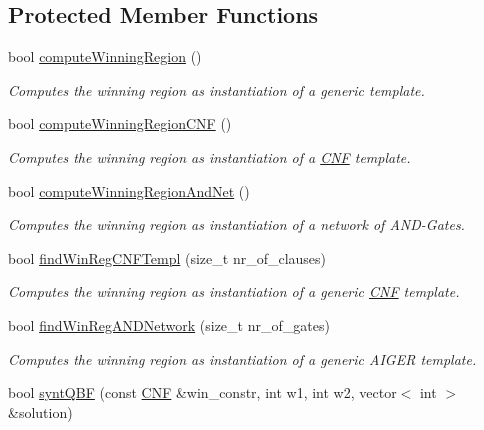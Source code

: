 \subsection*{Protected Member Functions}
\begin{DoxyCompactItemize}
\item 
bool \hyperlink{classTemplateSynth_ae334e4a6c30a324cfd4d0c05a32b191c}{compute\-Winning\-Region} ()
\begin{DoxyCompactList}\small\item\em Computes the winning region as instantiation of a generic template. \end{DoxyCompactList}\item 
bool \hyperlink{classTemplateSynth_affe9f11a75e689fd631692feac4031a1}{compute\-Winning\-Region\-C\-N\-F} ()
\begin{DoxyCompactList}\small\item\em Computes the winning region as instantiation of a \hyperlink{classCNF}{C\-N\-F} template. \end{DoxyCompactList}\item 
bool \hyperlink{classTemplateSynth_a9197dff7678cd88a7fea3c6b4358f85d}{compute\-Winning\-Region\-And\-Net} ()
\begin{DoxyCompactList}\small\item\em Computes the winning region as instantiation of a network of A\-N\-D-\/\-Gates. \end{DoxyCompactList}\item 
bool \hyperlink{classTemplateSynth_a499d1c0069b41ce11a6c7e7679fd4ece}{find\-Win\-Reg\-C\-N\-F\-Templ} (size\-\_\-t nr\-\_\-of\-\_\-clauses)
\begin{DoxyCompactList}\small\item\em Computes the winning region as instantiation of a generic \hyperlink{classCNF}{C\-N\-F} template. \end{DoxyCompactList}\item 
bool \hyperlink{classTemplateSynth_a1084d7b10de86dfbbe1368c68d4c0501}{find\-Win\-Reg\-A\-N\-D\-Network} (size\-\_\-t nr\-\_\-of\-\_\-gates)
\begin{DoxyCompactList}\small\item\em Computes the winning region as instantiation of a generic A\-I\-G\-E\-R template. \end{DoxyCompactList}\item 
bool \hyperlink{classTemplateSynth_ae01c9c2463c59f14f109e9379219535b}{synt\-Q\-B\-F} (const \hyperlink{classCNF}{C\-N\-F} \&win\-\_\-constr, int w1, int w2, vector$<$ int $>$ \&solution)

\end{DoxyCompactItemize}
